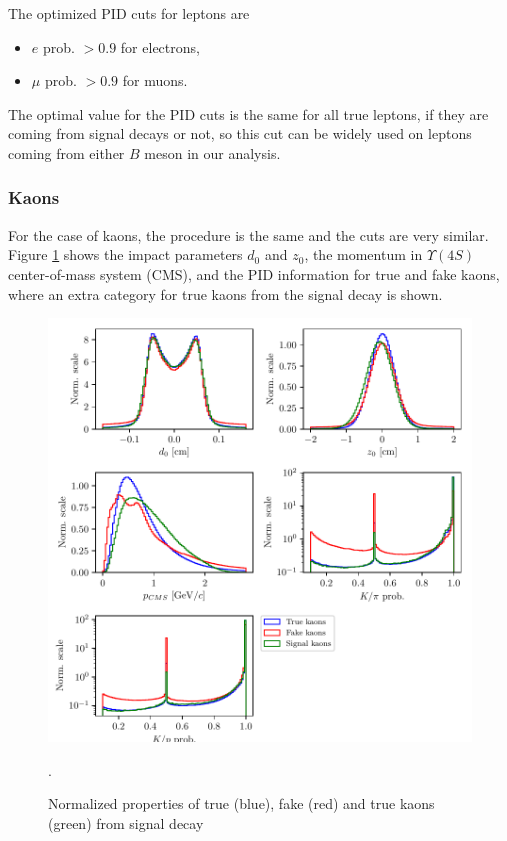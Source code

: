 \documentclass[oneside,a4paper,openany,12pt]{scrbook}
\begin{document}
The optimized PID cuts for leptons are
\begin{itemize}
\item $e$ prob. $ > 0.9$ for electrons,
\item $\mu$ prob. $ > 0.9$ for muons.
\end{itemize}

The optimal value for the PID cuts is the same for all true leptons, if they are coming from signal decays or not, so this cut can be widely used on leptons coming from either $B$ meson in our analysis.

\subsubsection{Kaons}

For the case of kaons, the procedure is the same and the cuts are very similar. Figure \ref{fig:Kvars} shows the impact parameters $d_0$ and $z_0$, the momentum in  $\Upsilon(4S)$ center-of-mass system (CMS), and the PID information for true and fake kaons, where an extra category for true kaons from the signal decay is shown.

\begin{figure}[H]
\centering
\includegraphics[scale=1]{fig/FSP_kaon_vars}
\captionsetup{width=.7\linewidth}
\caption{Normalized properties of true (blue), fake (red) and true kaons (green) from signal decay}.
\label{fig:Kvars}
\end{figure}
\end{document}
